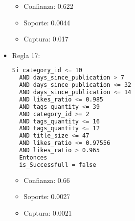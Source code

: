 \begin{itemize}
    \begin{itemize}
      \item Confianza: 0.622
      \item Soporte: 0.0044
      \item Captura: 0.017
    \end{itemize}

  \item Regla 17:

\begin{lstlisting}[language=bash, numbers=none]
  Si category_id <= 10
  AND days_since_publication > 7
  AND days_since_publication <= 32
  AND days_since_publication <= 14
  AND likes_ratio <= 0.985
  AND tags_quantity <= 39
  AND category_id >= 2
  AND tags_quantity <= 16
  AND tags_quantity <= 12
  AND title_size <= 47
  AND likes_ratio <= 0.97556
  AND likes_ratio > 0.965
  Entonces
  is_Successfull = false
\end{lstlisting}

    \begin{itemize}
      \item Confianza: 0.66
      \item Soporte: 0.0027
      \item Captura: 0.0021
    \end{itemize}

\end{itemize}
